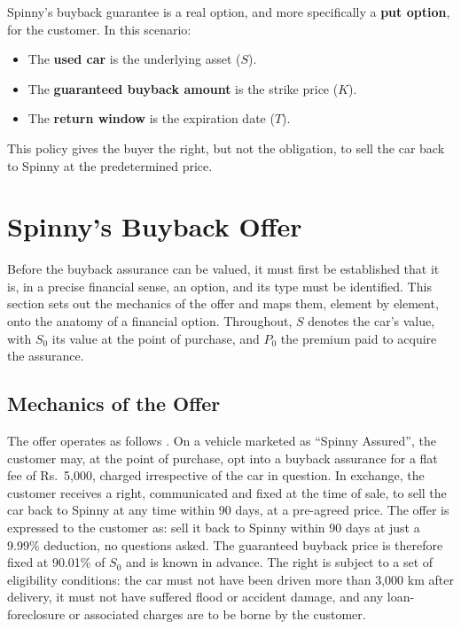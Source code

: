 \documentclass[11pt, a4paper]{article}
\begin{document}
Spinny's buyback guarantee is a real option, and more specifically a \textbf{put option}, for the customer. In this scenario:

\begin{itemize}
    \item The \textbf{used car} is the underlying asset ($S$).
    \item The \textbf{guaranteed buyback amount} is the strike price ($K$).
    \item The \textbf{return window} is the expiration date ($T$).
\end{itemize}

This policy gives the buyer the right, but not the obligation, to sell the car back to Spinny at the predetermined price.


\section{Spinny's Buyback Offer}
\label{sec:buyback_offer}

Before the buyback assurance can be valued, it must first be established that it is, in a precise financial sense, an option, and its type must be identified. This section sets out the mechanics of the offer and maps them, element by element, onto the anatomy of a financial option. Throughout, $S$ denotes the car's value, with $S_0$ its value at the point of purchase, and $P_0$ the premium paid to acquire the assurance.

\subsection{Mechanics of the Offer}

The offer operates as follows \cite{spinnybuyback}. On a vehicle marketed as ``Spinny Assured'', the customer may, at the point of purchase, opt into a buyback assurance for a flat fee of Rs.~5,000, charged irrespective of the car in question. In exchange, the customer receives a right, communicated and fixed at the time of sale, to sell the car back to Spinny at any time within 90 days, at a pre-agreed price. The offer is expressed to the customer as: sell it back to Spinny within 90 days at just a 9.99\% deduction, no questions asked. The guaranteed buyback price is therefore fixed at 90.01\% of $S_0$ and is known in advance. The right is subject to a set of eligibility conditions: the car must not have been driven more than 3,000 km after delivery, it must not have suffered flood or accident damage, and any loan-foreclosure or associated charges are to be borne by the customer.
\end{document}
